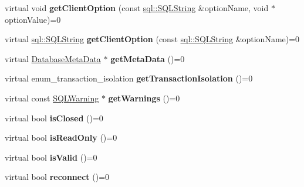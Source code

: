 \begin{DoxyCompactItemize}
\item 
\hypertarget{classsql_1_1_connection_af229eaaf1cbccba5c5adff81bafc7490}{}\label{classsql_1_1_connection_af229eaaf1cbccba5c5adff81bafc7490} 
virtual void {\bfseries get\+Client\+Option} (const \hyperlink{classsql_1_1_s_q_l_string}{sql\+::\+S\+Q\+L\+String} \&option\+Name, void $\ast$option\+Value)=0
\item 
\hypertarget{classsql_1_1_connection_a8410abb35dd37eafece37963723b8dc9}{}\label{classsql_1_1_connection_a8410abb35dd37eafece37963723b8dc9} 
virtual \hyperlink{classsql_1_1_s_q_l_string}{sql\+::\+S\+Q\+L\+String} {\bfseries get\+Client\+Option} (const \hyperlink{classsql_1_1_s_q_l_string}{sql\+::\+S\+Q\+L\+String} \&option\+Name)=0
\item 
\hypertarget{classsql_1_1_connection_a3c17f434b69575d3bd1be3583cff939a}{}\label{classsql_1_1_connection_a3c17f434b69575d3bd1be3583cff939a} 
virtual \hyperlink{classsql_1_1_database_meta_data}{Database\+Meta\+Data} $\ast$ {\bfseries get\+Meta\+Data} ()=0
\item 
\hypertarget{classsql_1_1_connection_ab52859926b376d2ec4aafe651e4f8e04}{}\label{classsql_1_1_connection_ab52859926b376d2ec4aafe651e4f8e04} 
virtual enum\+\_\+transaction\+\_\+isolation {\bfseries get\+Transaction\+Isolation} ()=0
\item 
\hypertarget{classsql_1_1_connection_a128d3eb822a93a88175ec51ca55380aa}{}\label{classsql_1_1_connection_a128d3eb822a93a88175ec51ca55380aa} 
virtual const \hyperlink{classsql_1_1_s_q_l_warning}{S\+Q\+L\+Warning} $\ast$ {\bfseries get\+Warnings} ()=0
\item 
\hypertarget{classsql_1_1_connection_aef81ff1a57e0fb723287d07706037882}{}\label{classsql_1_1_connection_aef81ff1a57e0fb723287d07706037882} 
virtual bool {\bfseries is\+Closed} ()=0
\item 
\hypertarget{classsql_1_1_connection_a3c0ff46c15fe16f2f18db2621f4b7b15}{}\label{classsql_1_1_connection_a3c0ff46c15fe16f2f18db2621f4b7b15} 
virtual bool {\bfseries is\+Read\+Only} ()=0
\item 
\hypertarget{classsql_1_1_connection_ac5d7d99c0b079b8e787f94181ca08ccb}{}\label{classsql_1_1_connection_ac5d7d99c0b079b8e787f94181ca08ccb} 
virtual bool {\bfseries is\+Valid} ()=0
\item 
\hypertarget{classsql_1_1_connection_af5c9506f3ee5ee20dd56857dbc58eb13}{}\label{classsql_1_1_connection_af5c9506f3ee5ee20dd56857dbc58eb13} 
virtual bool {\bfseries reconnect} ()=0
\item 
\hypertarget{classsql_1_1_connection_a99da5ede96a8c9f2e374a3d6fad8cb51}{}\label{classsql_1_1_connection_a99da5ede96a8c9f2e374a3d6fad8cb51} 

\end{DoxyCompactItemize}
